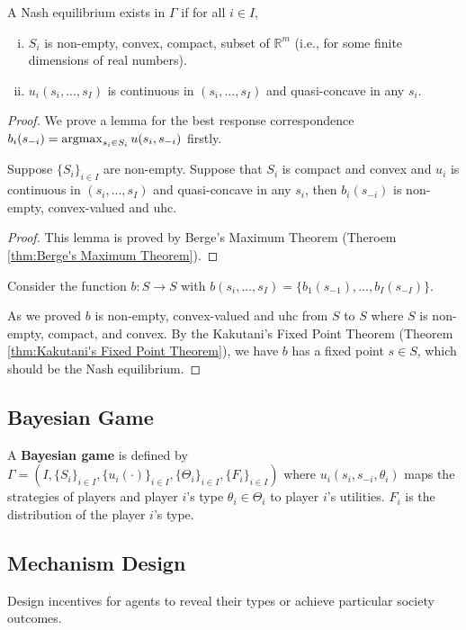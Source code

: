 \documentclass[11pt]{elegantbook}
\newcommand{\argmax}{\operatornamewithlimits{argmax}}
\begin{document}
\begin{theorem}
    A Nash equilibrium exists in $\Gamma$ if for all $i\in I$,
    \begin{enumerate}[(i).]
        \item $S_i$ is non-empty, convex, compact, subset of $\mathbb{R}^m$ (i.e., for some finite dimensions of real numbers).
        \item $u_i(s_i,...,s_I)$ is continuous in $(s_i,...,s_I)$ and quasi-concave in any $s_i$.
    \end{enumerate}
\end{theorem}
\begin{proof}
    We prove a lemma for the best response correspondence $b_i(s_{-i})=\argmax_{s_i\in S_i}u(s_i,s_{-i})$ firstly.
    \begin{lemma}
        Suppose $\{S_i\}_{i\in I}$ are non-empty. Suppose that $S_i$ is compact and convex and $u_i$ is continuous in $(s_i,...,s_I)$ and quasi-concave in any $s_i$, then $b_i(s_{-i})$ is non-empty, convex-valued and uhc.
    \end{lemma}
    \begin{proof}
        This lemma is proved by Berge's Maximum Theorem (Theroem \ref{thm:Berge's Maximum Theorem}).
    \end{proof}
    Consider the function $b: S \rightarrow S$ with $b(s_i,...,s_I)=\{b_1(s_{-1}),...,b_I(s_{-I})\}$.

    As we proved $b$ is non-empty, convex-valued and uhc from $S$ to $S$ where $S$ is non-empty, compact, and convex. By the Kakutani's Fixed Point Theorem (Theorem \ref{thm:Kakutani's Fixed Point Theorem}), we have $b$ has a fixed point $s\in S$, which should be the Nash equilibrium.
\end{proof}

\subsection{Bayesian Game}
\begin{definition}
    \normalfont
    A \textbf{Bayesian game} is defined by $\Gamma=(I, \{S_i\}_{i\in I}, \{u_i(\cdot)\}_{i\in I},\{\Theta_i\}_{i\in I}, \{F_i\}_{i\in I})$
    where $u_i(s_i,s_{-i},\theta_i)$ maps the strategies of players and player $i$'s type $\theta_i\in \Theta_i$ to player $i$'s utilities. $F_i$ is the distribution of the player $i$'s type.
\end{definition}


\subsection{Mechanism Design}
Design incentives for agents to reveal their types or achieve particular society outcomes.
\end{document}
